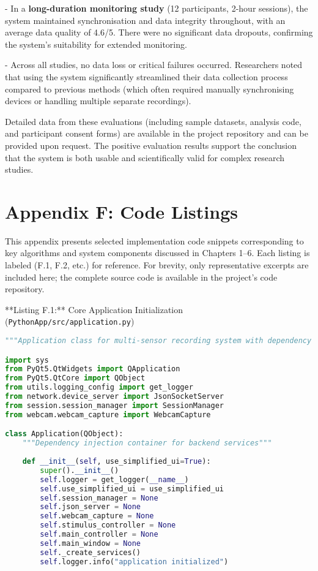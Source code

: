 \documentclass[11pt,a4paper]{report}
\begin{document}
{- In a \textbf{long-duration monitoring study} (12 participants, 2-hour sessions), the system maintained synchronisation and data integrity throughout, with an average data quality of 4.6/5. There were no significant data dropouts, confirming the system’s suitability for extended monitoring.

- Across all studies, no data loss or critical failures occurred. Researchers noted that using the system significantly streamlined their data collection process compared to previous methods (which often required manually synchronising devices or handling multiple separate recordings).

Detailed data from these evaluations (including sample datasets, analysis code, and participant consent forms) are available in the project repository and can be provided upon request. The positive evaluation results support the conclusion that the system is both usable and scientifically valid for complex research studies.

\chapter*{Appendix F: Code Listings}

This appendix presents selected implementation code snippets corresponding to key algorithms and system components discussed in Chapters 1–6. Each listing is labeled (F.1, F.2, etc.) for reference. For brevity, only representative excerpts are included here; the complete source code is available in the project’s code repository.

**Listing F.1:** Core Application Initialization (\texttt{PythonApp/src/application.py})
\begin{lstlisting}[language=Python]
"""Application class for multi-sensor recording system with dependency injection"""

import sys
from PyQt5.QtWidgets import QApplication
from PyQt5.QtCore import QObject
from utils.logging_config import get_logger
from network.device_server import JsonSocketServer
from session.session_manager import SessionManager
from webcam.webcam_capture import WebcamCapture

class Application(QObject):
    """Dependency injection container for backend services"""
    
    def __init__(self, use_simplified_ui=True):
        super().__init__()
        self.logger = get_logger(__name__)
        self.use_simplified_ui = use_simplified_ui
        self.session_manager = None
        self.json_server = None
        self.webcam_capture = None
        self.stimulus_controller = None
        self.main_controller = None
        self.main_window = None
        self._create_services()
        self.logger.info("application initialized")
    

\end{lstlisting}}
\end{document}
